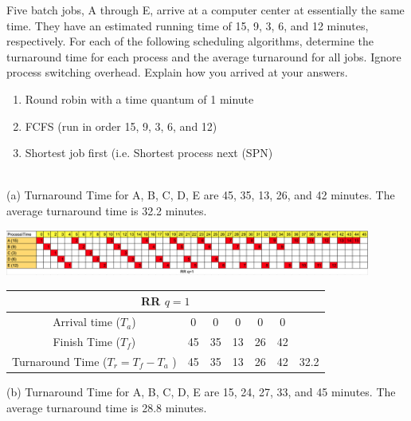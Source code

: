 \documentclass[12pt]{article}
\newenvironment{sol}[1][Solution]{\begin{trivlist}\item[\hskip\labelsep {\bfseries #1:}]}{\end{trivlist}}
\begin{document}
\begin{enumerate}
    \newpage
    \item Five batch jobs, A through E, arrive at a computer center at essentially the same time. They have an estimated running time of 15, 9, 3, 6, and 12 minutes, respectively. For each of the following scheduling algorithms, determine the turnaround time for each process and the average turnaround for all jobs. Ignore process switching overhead. Explain how you arrived at your answers. 
    \begin{enumerate}
        \item Round robin with a time quantum of 1 minute
        \item FCFS (run in order 15, 9, 3, 6, and 12)
        \item Shortest job first (i.e.  Shortest process next (SPN) 
    \end{enumerate}
    \begin{sol}
    \hspace*{\fill}\\
    (a) Turnaround Time for A, B, C, D, E are 45, 35, 13, 26, and 42 minutes. The average turnaround time is 32.2 minutes.
        \begin{center}
        \includegraphics[width=0.9\textwidth]{6.png}
        \begin{tabular}{|c|c|c|c|c|c|c|}
        \hline
        \multicolumn{7}{|c|}{RR $q=1$}  \\
        \hline 
         Arrival time ($T_a$) & 0 & 0 & 0 & 0 & 0 & \\
        \hline
         Finish Time ($T_f$)& 45 & 35 & 13 & 26 & 42 & \\
        \hline
         Turnaround Time ($T_r = T_f - T_a$ )& 45 & 35 & 13 & 26 & 42 & 32.2  \\ 
         \hline
         \end{tabular}
        \end{center}

    (b) Turnaround Time for A, B, C, D, E are 15, 24, 27, 33, and 45 minutes. The average turnaround time is 28.8 minutes.


\end{sol}
\end{enumerate}
\end{document}
